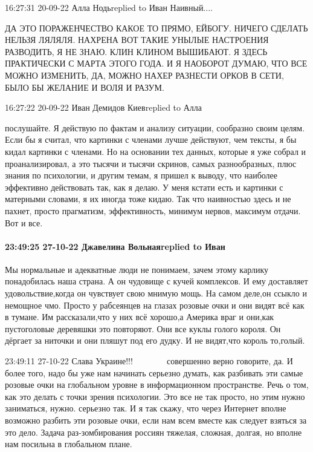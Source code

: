 

16:27:31 20-09-22
Алла Нодьreplied to Иван
Наивный....

ДА ЭТО ПОРАЖЕНЧЕСТВО КАКОЕ ТО ПРЯМО, ЕЙБОГУ. НИЧЕГО СДЕЛАТЬ НЕЛЬЗЯ ЛЯЛЯЛЯ.
НАХРЕНА ВОТ ТАКИЕ УНЫЛЫЕ НАСТРОЕНИЯ РАЗВОДИТЬ, Я НЕ ЗНАЮ. КЛИН КЛИНОМ ВЫШИБАЮТ.
Я ЗДЕСЬ ПРАКТИЧЕСКИ С МАРТА ЭТОГО ГОДА. И Я НАОБОРОТ ДУМАЮ, ЧТО ВСЕ МОЖНО
ИЗМЕНИТЬ, ДА, МОЖНО НАХЕР РАЗНЕСТИ ОРКОВ В СЕТИ, БЫЛО БЫ ЖЕЛАНИЕ И ВОЛЯ И
РАЗУМ.

16:27:22 20-09-22
Иван Демидов Киевreplied to Алла

послушайте. Я действую по фактам и анализу ситуации, сообразно своим целям.
Если бы я считал, что картинки с членами лучше действуют, чем тексты, я бы
кидал картинки с членами. Но на основании тех данных, которые я уже собрал и
проанализировал, а это тысячи и тысячи скринов, самых разнообразных, плюс
знания по психологии, и другим темам, я пришел к выводу, что наиболее
эффективно действовать так, как я делаю. У меня кстати есть и картинки с
матерными словами, я их иногда тоже кидаю. Так что наивностью здесь и не
пахнет, просто прагматизм, эффективность, минимум нервов, максимум отдачи. Вот
и все.

\paragraph{23:49:25 27-10-22 Джавелина Вольнаяreplied to Иван}

Мы нормальные и адекватные люди не понимаем, зачем этому карлику понадобилась
наша страна. А он чудовище с кучей комплексов. И ему доставляет
удовольствие,когда он чувствует свою мнимую мощь. На самом деле,он ссыкло и
немощное чмо. Просто у рабсеянцев на глазах розовые очки и они видят всё как в
тумане. Им рассказали,что у них всё хорошо,а Америка враг и они,как
пустоголовые деревяшки это повторяют. Они все куклы голого короля. Он дёргает
за ниточки и они пляшут под его дудку. И не видят,что король то,голый.

23:49:11 27-10-22
Слава Украине!!! 💛 💙 💛 💙 💛 💙 совершенно верно говорите, да. И более того,
надо бы уже нам начинать серьезно думать, как разбивать эти самые розовые очки
на глобальном уровне в информационном пространстве. Речь о том, как это делать
с точки зрения психологии. Это все не так просто, но этим нужно заниматься,
нужно. серьезно так. И я так скажу, что через Интернет вполне возможно разбить
эти розовые очки, если нам всем вместе как следует взяться за это дело. Задача
раз-зомбирования россиян тяжелая, сложная, долгая, но вполне нам посильна в
глобальном плане.

